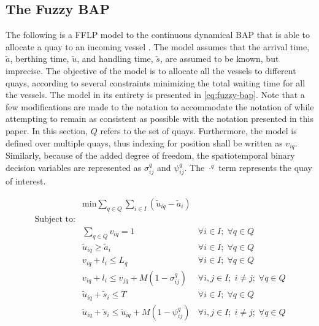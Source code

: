 \documentclass[ee,msthesis]{usuthesis}
\begin{document}
\subsection{The Fuzzy BAP}
\label{sec:the-fuzzy-bap}
The following is a FFLP model to the continuous dynamical BAP that is able to allocate a quay to an incoming vessel
\cite{bello-2019-fuzzy-activ}. The model assumes that the arrival time, \(\tilde{a}\), berthing time, \(\tilde{u}\), and
handling time, \(\tilde{s}\), are assumed to be known, but imprecise. The objective of the model is to allocate all the
vessels to different quays, according to several constraints minimizing the total waiting time for all the vessels. The
model in its entirety is presented in \ref{eq:fuzzy-bap}. Note that a few modifications are made to the notation to
accommodate the notation of \cite{bello-2019-fuzzy-activ} while attempting to remain as consistent as possible with the
notation presented in this paper. In this section, \(Q\) refers to the set of quays. Furthermore, the model is defined
over multiple quays, thus indexing for position shall be written as \(v_{iq}\). Similarly, because of the added degree of
freedom, the spatiotemporal binary decision variables are represented as \(\sigma^q_{ij}\) and \(\psi^q_{ij}\). The \(\cdot^q\) term
represents the quay of interest.

\begin{equation}
\label{eq:fuzzy-bap}
\begin{array}{lll}
                   & \text{min} \sum_{q \in Q}\sum_{i \in I} (\tilde{u}_{iq} - \tilde{a}_i)           &                                \\
\text{Subject to:} &                                                             &                                    \\
                   & \sum_{q \in Q} v_{iq} = 1                                          & \forall i \in I;\; \forall q \in Q               \\
                   & \tilde{u}_{iq} \ge \tilde{a}_i                                 & \forall i \in I;\; \forall q \in Q                \\
                   & v_{iq} + l_i \le L_q                                           & \forall i \in I;\; \forall q \in Q                \\
                   & v_{iq} + l_i \le v_{jq} + M(1-\sigma^q_{ij})                           & \forall i,j \in I;\; i \ne j;\; \forall q \in Q   \\
                   & \tilde{u}_{iq} + \tilde{s}_i \le T                             & \forall i \in I;\; \forall q \in Q                \\
                   & \tilde{u}_{iq} + \tilde{s}_i \le \tilde{u}_{iq} + M(1-\psi^q_{ij})   & \forall i,j \in I;\; i \ne j;\; \forall q \in Q \\
\end{array}
\end{equation}
\end{document}
